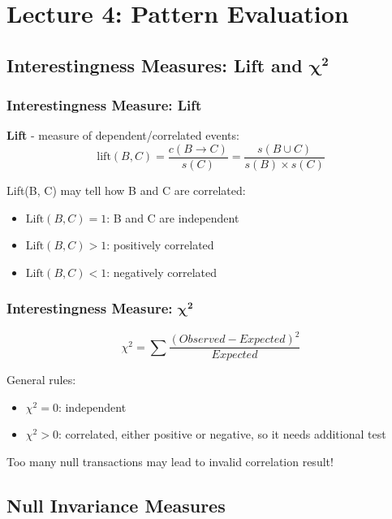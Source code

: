 \section{Lecture 4: Pattern Evaluation}

\subsection{Interestingness Measures: Lift and $\mathbf{\chi ^2}$}

\subsubsection{Interestingness Measure: Lift}

\textbf{Lift} - measure of dependent/correlated events:
\begin{equation*}
\mathrm{lift}(B,C) = \frac{c(B \to C)}{s(C)} = \frac{s(B \cup C)}{s(B) \times s(C)}
\end{equation*}

Lift(B, C) may tell how B and C are correlated:
\begin{itemize}
\item $\mathrm{Lift}(B, C) = 1$: B and C are independent
\item $\mathrm{Lift}(B, C) > 1$: positively correlated
\item $\mathrm{Lift}(B, C) < 1$: negatively correlated
\end{itemize}

\subsubsection{Interestingness Measure: $\mathbf{\chi ^2}$}
\begin{equation*}
\chi^2=\sum\frac{(Observed-Expected)^2}{Expected}
\end{equation*}

General rules:
\begin{itemize}
\item $\chi^2 = 0$: independent
\item $\chi^2 > 0$: correlated, either positive or negative, so it needs additional test
\end{itemize}

Too many null transactions may lead to invalid correlation result!

\subsection{Null Invariance Measures}

